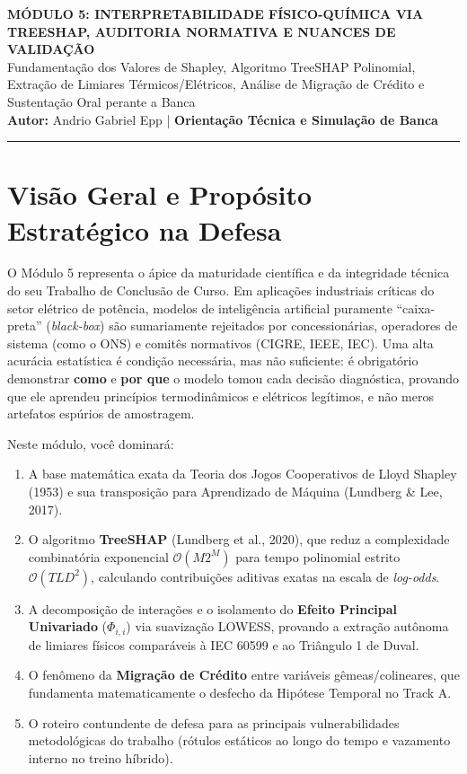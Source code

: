 \documentclass[11pt,a4paper]{article}
\begin{document}
\begin{center}
  {\Large \textbf{\textsf{\color{NavyBlue}MÓDULO 5: INTERPRETABILIDADE FÍSICO-QUÍMICA VIA TREESHAP, AUDITORIA NORMATIVA E NUANCES DE VALIDAÇÃO}}}\\[0.25cm]
  {\large \textsf{\color{DarkSlateGray}Fundamentação dos Valores de Shapley, Algoritmo TreeSHAP Polinomial, Extração de Limiares Térmicos/Elétricos, Análise de Migração de Crédito e Sustentação Oral perante a Banca}}\\[0.3cm]
  \textsf{\textbf{Autor:} Andrio Gabriel Epp | \textbf{Orientação Técnica e Simulação de Banca}}
\end{center}
\vspace{-0.2cm}
\noindent\rule{\textwidth}{1.2pt}

\section{Visão Geral e Propósito Estratégico na Defesa}

O Módulo 5 representa o ápice da maturidade científica e da integridade técnica do seu Trabalho de Conclusão de Curso. Em aplicações industriais críticas do setor elétrico de potência, modelos de inteligência artificial puramente ``caixa-preta'' (\textit{black-box}) são sumariamente rejeitados por concessionárias, operadores de sistema (como o ONS) e comitês normativos (CIGRE, IEEE, IEC). Uma alta acurácia estatística é condição necessária, mas não suficiente: é obrigatório demonstrar \textbf{como} e \textbf{por que} o modelo tomou cada decisão diagnóstica, provando que ele aprendeu princípios termodinâmicos e elétricos legítimos, e não meros artefatos espúrios de amostragem.

Neste módulo, você dominará:
\begin{enumerate}[leftmargin=*]
  \item A base matemática exata da Teoria dos Jogos Cooperativos de Lloyd Shapley (1953) e sua transposição para Aprendizado de Máquina (Lundberg \& Lee, 2017).
  \item O algoritmo \textbf{TreeSHAP} (Lundberg et al., 2020), que reduz a complexidade combinatória exponencial $\mathcal{O}(M 2^M)$ para tempo polinomial estrito $\mathcal{O}(T L D^2)$, calculando contribuições aditivas exatas na escala de \textit{log-odds}.
  \item A decomposição de interações e o isolamento do \textbf{Efeito Principal Univariado} ($\Phi_{i, i}$) via suavização LOWESS, provando a extração autônoma de limiares físicos comparáveis à IEC 60599 e ao Triângulo 1 de Duval.
  \item O fenômeno da \textbf{Migração de Crédito} entre variáveis gêmeas/colineares, que fundamenta matematicamente o desfecho da Hipótese Temporal no Track A.
  \item O roteiro contundente de defesa para as principais vulnerabilidades metodológicas do trabalho (rótulos estáticos ao longo do tempo e vazamento interno no treino híbrido).
\end{enumerate}
\end{document}
